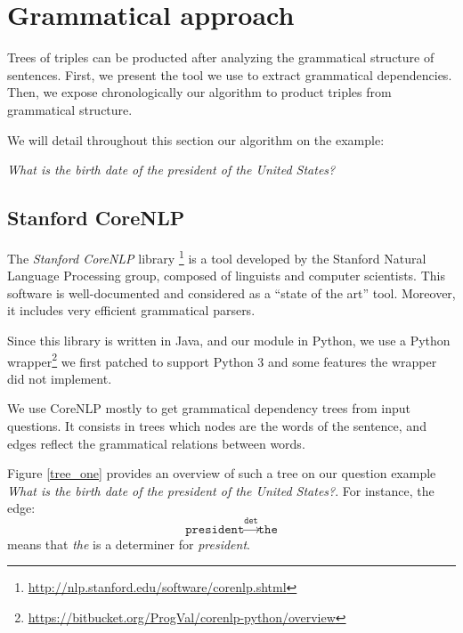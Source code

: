 \section{Grammatical approach}

Trees of triples can be producted after analyzing the grammatical structure of sentences. First, we  present the tool we use to extract grammatical dependencies. Then, we expose chronologically our algorithm to product triples from grammatical structure.

We will detail throughout this section our algorithm on the example:
\begin{center}
 \textit{What is the birth date of the president of the United States?}
\end{center}


\subsection{Stanford CoreNLP}

The \emph{Stanford CoreNLP} library \footnote{\url{http://nlp.stanford.edu/software/corenlp.shtml}} is a tool developed by the Stanford Natural Language Processing group, composed of linguists and computer scientists. This software is well-documented and considered as a ``state of the art'' tool. Moreover, it includes very efficient grammatical parsers.

Since this library is written in Java, and our module in Python, we use a Python wrapper\footnote{\url{https://bitbucket.org/ProgVal/corenlp-python/overview}} we first patched to support Python 3 and some features the wrapper did not implement.

We use CoreNLP mostly to get grammatical dependency trees from input questions. It consists in trees which nodes are the words of the sentence, and edges reflect the grammatical relations between words.

Figure \ref{tree_one} provides an overview of such a tree on our question example \emph{What is the birth date of the president of the United States?}. For instance, the edge:
  \[\texttt{president}\xrightarrow{\texttt{det}}\texttt{the}\]
means that \emph{the} is a determiner for \emph{president}.

